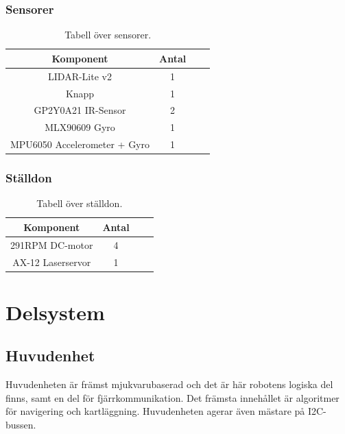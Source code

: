 \documentclass{article}
\begin{document}
\subsubsection{Sensorer}
\begin{table}[H]
  \centering
  \begin{tabular}{ | c | c | c | c |}
    \hline
    \textbf{Komponent} & \textbf{Antal} \\
    \hline
    LIDAR-Lite v2 & 1 \\
    \hline
    Knapp & 1 \\
    \hline
    GP2Y0A21 IR-Sensor & 2 \\
    \hline
    MLX90609 Gyro & 1 \\
    \hline
    MPU6050 Accelerometer + Gyro & 1 \\
    \hline
  \end{tabular}
  \caption{ Tabell över sensorer. }
\end{table}

\subsubsection{Ställdon}
\begin{table}[H]
  \centering
  \begin{tabular}{ | c | c | c | c |}
    \hline
    \textbf{Komponent} & \textbf{Antal} \\
    \hline
    291RPM DC-motor & 4 \\
   \hline
    AX-12 Laserservor & 1 \\
    \hline
  \end{tabular}
  \caption{ Tabell över ställdon. }
\end{table}

\clearpage

\section{Delsystem}

\subsection{Huvudenhet}

Huvudenheten är främst mjukvarubaserad och det är här robotens logiska del finns, samt en del för fjärrkommunikation. Det främsta innehållet är algoritmer för navigering och kartläggning. Huvudenheten agerar även mästare på I2C-bussen.
\end{document}
